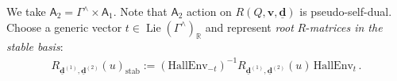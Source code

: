 \documentclass[10pt]{amsart}
\theoremstyle{definition}
\numberwithin{equation}{section}
\newcommand{\HallEnv}{\mathrm{HallEnv}}
\newcommand{\bR}{\mathbb{R}}
\newcommand{\bv}{\mathbf{v}}
\newcommand{\bd}{\mathbf{d}}
\newcommand{\cM}{\mathcal{M}}
\newcommand{\sA}{\mathsf{A}}
\newcommand{\Lie}{\operatorname{Lie}}
\newcommand{\In}{\operatorname{in}}
\newcommand{\Out}{\operatorname{out}}
\begin{document}
We take $\sA_2= \Gamma^{\wedge}\times \sA_1$. Note that $\sA_2$ action on $R(Q,\bv, \underline{\bd})$ is pseudo-self-dual. Choose a generic vector $t\in \Lie(\Gamma^{\wedge})_\bR$ and represent \textit{root} $R$-\textit{matrices in the stable basis}:
\begin{align*}
    R_{\underline{\bd}^{(1)},\underline{\bd}^{(2)}}(u)_{\mathrm{stab}}:=
    (\HallEnv_{-t})^{-1}R_{\underline{\bd}^{(1)},\underline{\bd}^{(2)}}(u)\,\HallEnv_{t}\,.
\end{align*}

\end{document}
